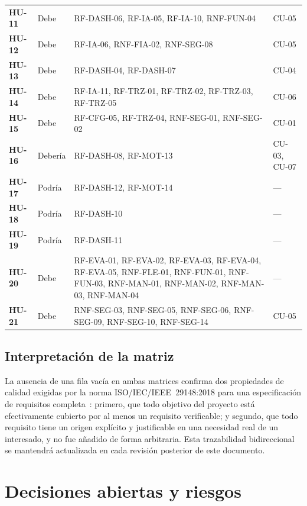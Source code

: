 \documentclass[11pt,a4paper]{report}
\begin{document}
\begin{xltabular}{\linewidth}{@{}p{1.6cm}p{1.6cm}Xp{2cm}@{}}
\textbf{HU-11} & Debe & {\footnotesize RF-DASH-06, RF-IA-05, RF-IA-10, RNF-FUN-04} & CU-05 \\
\textbf{HU-12} & Debe & {\footnotesize RF-IA-06, RNF-FIA-02, RNF-SEG-08} & CU-05 \\
\textbf{HU-13} & Debe & {\footnotesize RF-DASH-04, RF-DASH-07} & CU-04 \\
\textbf{HU-14} & Debe & {\footnotesize RF-IA-11, RF-TRZ-01, RF-TRZ-02, RF-TRZ-03, RF-TRZ-05} & CU-06 \\
\textbf{HU-15} & Debe & {\footnotesize RF-CFG-05, RF-TRZ-04, RNF-SEG-01, RNF-SEG-02} & CU-01 \\
\textbf{HU-16} & Debería & {\footnotesize RF-DASH-08, RF-MOT-13} & CU-03, CU-07 \\
\textbf{HU-17} & Podría & {\footnotesize RF-DASH-12, RF-MOT-14} & --- \\
\textbf{HU-18} & Podría & {\footnotesize RF-DASH-10} & --- \\
\textbf{HU-19} & Podría & {\footnotesize RF-DASH-11} & --- \\
\textbf{HU-20} & Debe & {\footnotesize RF-EVA-01, RF-EVA-02, RF-EVA-03, RF-EVA-04, RF-EVA-05, RNF-FLE-01, RNF-FUN-01, RNF-FUN-03, RNF-MAN-01, RNF-MAN-02, RNF-MAN-03, RNF-MAN-04} & --- \\
\textbf{HU-21} & Debe & {\footnotesize RNF-SEG-03, RNF-SEG-05, RNF-SEG-06, RNF-SEG-09, RNF-SEG-10, RNF-SEG-14} & CU-05 \\

\end{xltabular}

\section{Interpretaci\'on de la matriz}

La ausencia de una fila vac\'ia en ambas matrices confirma dos propiedades de calidad exigidas por la norma ISO/IEC/IEEE~29148:2018 para una especificaci\'on de requisitos completa~\cite{R1}: primero, que todo objetivo del proyecto est\'a efectivamente cubierto por al menos un requisito verificable; y segundo, que todo requisito tiene un origen expl\'icito y justificable en una necesidad real de un interesado, y no fue a\~nadido de forma arbitraria. Esta trazabilidad bidireccional se mantendr\'a actualizada en cada revisi\'on posterior de este documento.

\chapter{Decisiones abiertas y riesgos}
\label{ch:riesgos}
\end{document}
